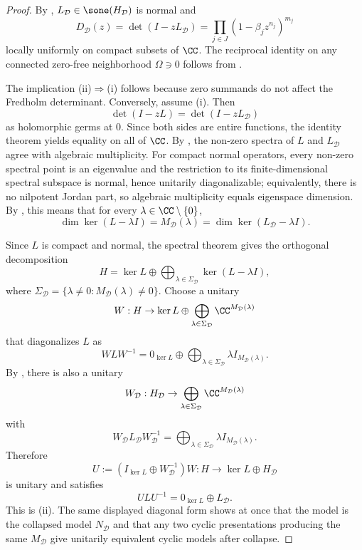 \begin{proof}
  By ,
  \(L_{\mathcal D}\in\sone(H_{\mathcal D})\) is normal and
  \[
    D_{\mathcal D}(z)
    =\det(I-zL_{\mathcal D})
    =\prod_{j\in J}(1-\beta_j z^{n_j})^{m_j}
  \]
  locally uniformly on compact subsets of \(\CC\). The reciprocal identity
  on any connected zero-free neighborhood \(\Omega\ni0\) follows from
  .

  The implication \textup{(ii)}\(\Rightarrow\)\textup{(i)} follows because
  zero summands do not affect the Fredholm determinant. Conversely, assume
  \textup{(i)}. Then
  \[
    \det(I-zL)=\det(I-zL_{\mathcal D})
  \]
  as holomorphic germs at \(0\). Since both sides are entire functions,
  the identity theorem yields equality on all of \(\CC\). By
  , the non-zero spectra of \(L\) and
  \(L_{\mathcal D}\) agree with algebraic multiplicity. For compact normal
  operators, every non-zero spectral point is an eigenvalue and the
  restriction to its finite-dimensional spectral subspace is normal,
  hence unitarily diagonalizable; equivalently, there is no nilpotent
  Jordan part, so algebraic multiplicity equals eigenspace dimension. By
  , this means that for every
  \(\lambda\in\CC\setminus\{0\}\),
  \[
    \dim\ker(L-\lambda I)=M_{\mathcal D}(\lambda)
    =\dim\ker(L_{\mathcal D}-\lambda I).
  \]

  Since \(L\) is compact and normal, the spectral theorem gives the
  orthogonal decomposition
  \[
    H=\ker L\oplus
    \bigoplus_{\lambda\in\Sigma_{\mathcal D}}\ker(L-\lambda I),
  \]
  where
  \(\Sigma_{\mathcal D}=\{\lambda\neq0:M_{\mathcal D}(\lambda)\neq0\}\).
  Choose a unitary
  \[
    W:H\to \ker L\oplus
    \bigoplus_{\lambda\in\Sigma_{\mathcal D}}\CC^{M_{\mathcal D}(\lambda)}
  \]
  that diagonalizes \(L\) as
  \[
    W L W^{-1}
    =0_{\ker L}\oplus
    \bigoplus_{\lambda\in\Sigma_{\mathcal D}}
      \lambda I_{M_{\mathcal D}(\lambda)}.
  \]
  By , there is also a unitary
  \[
    W_{\mathcal D}:H_{\mathcal D}\to
    \bigoplus_{\lambda\in\Sigma_{\mathcal D}}\CC^{M_{\mathcal D}(\lambda)}
  \]
  with
  \[
    W_{\mathcal D}L_{\mathcal D}W_{\mathcal D}^{-1}
    =\bigoplus_{\lambda\in\Sigma_{\mathcal D}}
      \lambda I_{M_{\mathcal D}(\lambda)}.
  \]
  Therefore
  \[
    U:=(I_{\ker L}\oplus W_{\mathcal D}^{-1})W
    :H\to \ker L\oplus H_{\mathcal D}
  \]
  is unitary and satisfies
  \[
    ULU^{-1}=0_{\ker L}\oplus L_{\mathcal D}.
  \]
  This is \textup{(ii)}.  The same displayed diagonal form shows at once
  that the model is the collapsed model \(N_{\mathcal D}\) and that any two
  cyclic presentations producing the same \(M_{\mathcal D}\) give unitarily
  equivalent cyclic models after collapse.
\end{proof}


